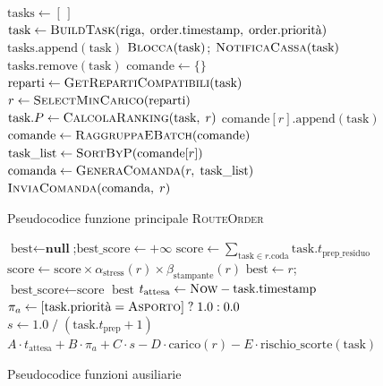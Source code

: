 \begin{figure}[H]
\begin{algorithmic}[1]
    \State $\text{tasks} \gets [\,]$
     
        \State $\text{task} \gets \Call{BuildTask}{\text{riga},\;\text{order.timestamp},\;\text{order.priorità}}$
        \State $\text{tasks}.\text{append}(\text{task})$
    \EndFor
     
            \State $\Call{Blocca}{\text{task}}$;\; $\Call{NotificaCassa}{\text{task}}$
            \State $\text{tasks}.\text{remove}(\text{task})$
        \EndIf
    \EndFor
    \State $\text{comande} \gets \{\}$
     
        \State $\text{reparti} \gets \Call{GetRepartiCompatibili}{\text{task}}$ 
        \State $r \gets \Call{SelectMinCarico}{\text{reparti}}$ 
        \State $\text{task}.P \gets \Call{CalcolaRanking}{\text{task},\;r}$ 
        \State $\text{comande}[r].\text{append}(\text{task})$
    \EndFor
    \State $\text{comande} \gets \Call{RaggruppaEBatch}{\text{comande}}$ 
        \State $\text{task\_list} \gets \Call{SortByP}{\text{comande}[r]}$ 
        \State $\text{comanda} \gets \Call{GeneraComanda}{r,\;\text{task\_list}}$
        \State $\Call{InviaComanda}{\text{comanda},\;r}$
    \EndFor
\EndProcedure
\end{algorithmic}
\caption{Pseudocodice funzione principale \textsc{RouteOrder}}
\label{alg:routeorder}
\end{figure}

\begin{figure}[H]
\begin{algorithmic}[1]
 
    \State $\text{best} \gets \textbf{null}$;\quad $\text{best\_score} \gets +\infty$
        \State $\text{score} \gets \displaystyle\sum_{\text{task} \in r.\text{coda}} \text{task}.t_{\text{prep\_residuo}}$
        \State $\text{score} \gets \text{score} \times \alpha_{\text{stress}}(r) \times \beta_{\text{stampante}}(r)$
            \State $\text{best} \gets r$;\; $\text{best\_score} \gets \text{score}$
        \EndIf
    \EndFor
    \State \Return $\text{best}$
\EndProcedure
\Statex
{} 
    \State $t_{\text{attesa}} \gets \Call{Now}{} - \text{task.timestamp}$
    \State $\pi_a \gets [\text{task.priorità} = \textsc{Asporto}]\;?\;1.0 : 0.0$
    \State $s \gets 1.0\;/\;(\text{task}.t_{\text{prep}} + 1)$
    \State \Return $A \cdot t_{\text{attesa}} + B \cdot \pi_a + C \cdot s - D \cdot \text{carico}(r) - E \cdot \text{rischio\_scorte}(\text{task})$
\EndProcedure
\end{algorithmic}
\caption{Pseudocodice funzioni ausiliarie}
\label{alg:subfunzioni}
\end{figure}

